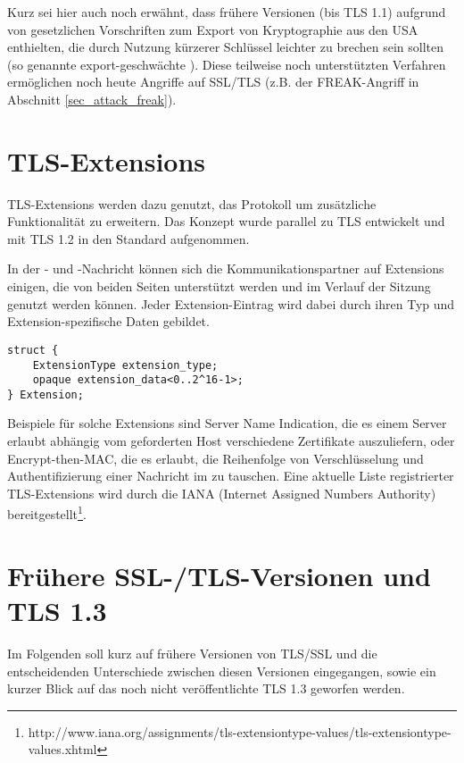 Kurz sei hier auch noch erwähnt, dass frühere Versionen (bis TLS 1.1) aufgrund von gesetzlichen Vorschriften zum Export von Kryptographie aus den USA \ciphersuites{} enthielten, die durch Nutzung kürzerer Schlüssel leichter zu brechen sein sollten (so genannte export-geschwächte \ciphersuites{}). Diese teilweise noch unterstützten Verfahren ermöglichen noch heute Angriffe auf SSL/TLS (z.B. der FREAK-Angriff in Abschnitt \ref{sec_attack_freak}).

\section{TLS-Extensions}

\label{sec_tls_extensions}

TLS-Extensions werden dazu genutzt, das Protokoll um zusätzliche Funktionalität zu erweitern. Das Konzept wurde parallel zu TLS entwickelt und mit TLS 1.2 in den Standard aufgenommen.

In der \clienthello{}- und \serverhello{}-Nachricht können sich die Kommunikationspartner auf Extensions einigen, die von beiden Seiten unterstützt werden und im Verlauf der Sitzung genutzt werden können. Jeder Extension-Eintrag wird dabei durch ihren Typ und Extension-spezifische Daten gebildet. 
\begin{lstlisting}
struct {
	ExtensionType extension_type;
	opaque extension_data<0..2^16-1>;
} Extension;
\end{lstlisting}

Beispiele für solche Extensions sind Server Name Indication, die es einem Server erlaubt abhängig vom geforderten Host verschiedene Zertifikate auszuliefern, oder Encrypt-then-MAC, die es erlaubt, die Reihenfolge von Verschlüsselung und Authentifizierung einer Nachricht im \recordprotocol{} zu tauschen. Eine aktuelle Liste registrierter TLS-Extensions wird durch die IANA (Internet Assigned Numbers Authority) bereitgestellt\footnote{http://www.iana.org/assignments/tls-extensiontype-values/tls-extensiontype-values.xhtml}.

\section{Frühere SSL-/TLS-Versionen und TLS 1.3}

Im Folgenden soll kurz auf frühere Versionen von TLS/SSL und die entscheidenden Unterschiede zwischen diesen Versionen eingegangen, sowie ein kurzer Blick auf das noch nicht veröffentlichte TLS 1.3 geworfen werden.

